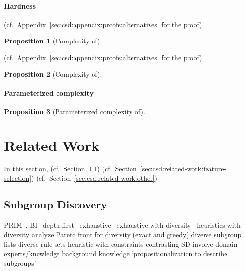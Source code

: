\documentclass{article}
\newtheorem{proposition}{Proposition}
\theoremstyle{definition}
\begin{document}
\paragraph{Hardness}

(cf.~Appendix~\ref{sec:csd:appendix:proofs:alternatives} for the proof)

\begin{proposition}[Complexity of]
	\label{prop:csd:complexity-alternatives-perfect-box}
\end{proposition}

(cf.~Appendix~\ref{sec:csd:appendix:proofs:alternatives} for the proof)

\begin{proposition}[Complexity of]
	\label{prop:csd:complexity-alternatives-imperfect-box}
\end{proposition}

\paragraph{Parameterized complexity}

\begin{proposition}[Parameterized complexity of]
	\label{prop:csd:complexity-alternatives-xp}
\end{proposition}

\section{Related Work}
\label{sec:csd:related-work}

In this section, (cf.~Section~\ref{sec:csd:related-work:subgroup-discovery}) (cf.~Section~\ref{sec:csd:related-work:feature-selection})
(cf.~Section~\ref{sec:csd:related-work:other})

\subsection{Subgroup Discovery}
\label{sec:csd:related-work:subgroup-discovery}

PRIM~\cite{friedman1999bump}, BI~\cite{mampaey2012efficient}
depth-first~\cite{millot2020optimal}
exhaustive~\cite{atzmueller2006sd, atzmueller2009fast, grosskreutz2009subgroup, lemmerich2016fast}
exhaustive with diversity~\cite{bosc2018anytime, lemmerich2010fast}
heuristics with diversity \cite{leeuwen2012diverse, lucas2018ssdp+, proencca2022robust}
analyze Pareto front for diversity (exact and greedy) \cite{leeuwen2013discovering}
diverse subgroup lists \cite{lopez2023discovering, lopez2023novel}
diverse rule sets \cite{zhang2020diverse}
heuristic with constraints \cite{lavravc2006relevancy}
contrasting SD \cite{langohr2013contrasting}
involve domain experts/knowledge \cite{dzyuba2013interactive, gamberger2002expert, lemmerich2011local}
background knowledge \cite{atzmueller2005exploiting, atzmueller2006methodological}
`propositionalization to describe subgroups' \cite{zelezny2006propositionalization}
\end{document}
